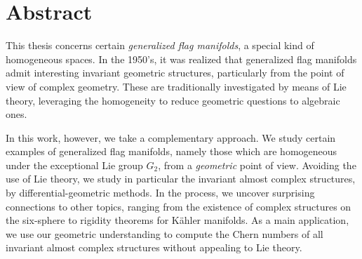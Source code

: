\documentclass[parskip=half]{scrbook}
\begin{document}
\chapter{Abstract}

This thesis concerns certain \emph{generalized flag manifolds}, a special kind of homogeneous spaces. In the 1950's, it was realized that generalized flag manifolds admit interesting invariant geometric structures, particularly from the point of view of complex geometry. These are traditionally investigated by means of Lie theory, leveraging the homogeneity to reduce geometric questions to algebraic ones. 

In this work, however, we take a complementary approach. We study certain examples of generalized flag manifolds, namely those which are homogeneous under the exceptional Lie group $G_2$, from a \emph{geometric} point of view. Avoiding the use of Lie theory, we study in particular the invariant almost complex structures, by differential-geometric methods. In the process, we uncover surprising connections to other topics, ranging from the existence of complex structures on the six-sphere to rigidity theorems for K\"ahler manifolds. As a main application, we use our geometric understanding to compute the Chern numbers of all invariant almost complex structures without appealing to Lie theory.
\end{document}
